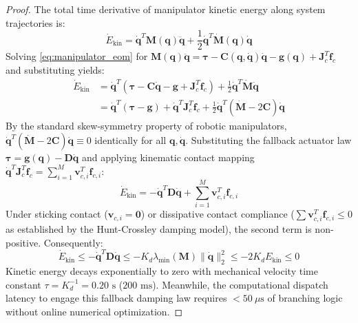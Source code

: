 \begin{proof}
The total time derivative of manipulator kinetic energy along system trajectories is:
\begin{equation}
    \dot{E}_{\text{kin}} = \dot{\mathbf{q}}^T \mathbf{M}(\mathbf{q}) \ddot{\mathbf{q}} + \frac{1}{2} \dot{\mathbf{q}}^T \dot{\mathbf{M}}(\mathbf{q}) \dot{\mathbf{q}}
\end{equation}
Solving \eqref{eq:manipulator_eom} for $\mathbf{M}(\mathbf{q}) \ddot{\mathbf{q}} = \boldsymbol{\tau} - \mathbf{C}(\mathbf{q}, \dot{\mathbf{q}}) \dot{\mathbf{q}} - \mathbf{g}(\mathbf{q}) + \mathbf{J}_c^T \mathbf{f}_c$ and substituting yields:
\begin{align}
    \dot{E}_{\text{kin}} &= \dot{\mathbf{q}}^T \left( \boldsymbol{\tau} - \mathbf{C}\dot{\mathbf{q}} - \mathbf{g} + \mathbf{J}_c^T \mathbf{f}_c \right) + \frac{1}{2} \dot{\mathbf{q}}^T \dot{\mathbf{M}} \dot{\mathbf{q}} \nonumber \\
    &= \dot{\mathbf{q}}^T (\boldsymbol{\tau} - \mathbf{g}) + \dot{\mathbf{q}}^T \mathbf{J}_c^T \mathbf{f}_c + \frac{1}{2} \dot{\mathbf{q}}^T (\dot{\mathbf{M}} - 2\mathbf{C}) \dot{\mathbf{q}}
\end{align}
By the standard skew-symmetry property of robotic manipulators, $\dot{\mathbf{q}}^T (\dot{\mathbf{M}} - 2\mathbf{C}) \dot{\mathbf{q}} \equiv 0$ identically for all $\mathbf{q}, \dot{\mathbf{q}}$. Substituting the fallback actuator law $\boldsymbol{\tau} = \mathbf{g}(\mathbf{q}) - \mathbf{D}\dot{\mathbf{q}}$ and applying kinematic contact mapping $\dot{\mathbf{q}}^T \mathbf{J}_c^T \mathbf{f}_c = \sum_{i=1}^M \mathbf{v}_{c, i}^T \mathbf{f}_{c, i}$:
\begin{equation}
    \dot{E}_{\text{kin}} = -\dot{\mathbf{q}}^T \mathbf{D} \dot{\mathbf{q}} + \sum_{i=1}^M \mathbf{v}_{c, i}^T \mathbf{f}_{c, i}
\end{equation}
Under sticking contact ($\mathbf{v}_{c, i} = \mathbf{0}$) or dissipative contact compliance ($\sum \mathbf{v}_{c, i}^T \mathbf{f}_{c, i} \le 0$ as established by the Hunt-Crossley damping model), the second term is non-positive. Consequently:
\begin{equation}
    \dot{E}_{\text{kin}} \le -\dot{\mathbf{q}}^T \mathbf{D} \dot{\mathbf{q}} \le -K_d \lambda_{\min}(\mathbf{M}) \|\dot{\mathbf{q}}\|_2^2 \le -2 K_d E_{\text{kin}} \le 0
\end{equation}
Kinetic energy decays exponentially to zero with mechanical velocity time constant $\tau = K_d^{-1} = 0.20\text{ s}$ ($200\text{ ms}$). Meanwhile, the computational dispatch latency to engage this fallback damping law requires $< 50\ \mu\text{s}$ of branching logic without online numerical optimization.
\end{proof}

